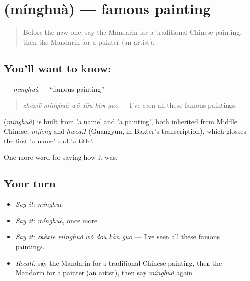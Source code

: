 \section[\texorpdfstring{\zh{名画} (mínghuà)}{名画 (mínghuà)}]{ (mínghuà) — famous painting}

\label{lesson:ZH-C502-minghua}



\begin{quote}
Before the new one: say the Mandarin for a traditional Chinese painting, then the Mandarin for a painter (an artist).
\end{quote}

\subsection*{You'll want to know: }
\textbf{} — \emph{mínghuà} — \textquotedblleft{}famous painting\textquotedblright{}.

\begin{quote}
\textbf{} \emph{zhèxiē mínghuà wǒ dōu kàn guo} — I've seen all these famous paintings.
\end{quote}

\begin{cousinweb}
\textbf{} (\emph{mínghuà}) is built from  'a name' and  'a painting', both inherited from Middle Chinese, \emph{mjieng} and \emph{hweaH} (Guangyun, in Baxter's transcription), which glosses the first 'a name' and 'a title'.
\end{cousinweb}

\begin{grammarlens}[title={What you've built}]
One more word for saying how it was.
\end{grammarlens}

\subsection*{Your turn}
\begin{itemize}
\raggedright
  \item \emph{Say it:} \emph{mínghuà}
  \item \emph{Say it:} \emph{mínghuà}, once more
  \item \emph{Say it:} \emph{zhèxiē mínghuà wǒ dōu kàn guo} — I've seen all these famous paintings.
  \item \emph{Recall:} say the Mandarin for a traditional Chinese painting, then the Mandarin for a painter (an artist), then say \emph{mínghuà} again
\end{itemize}

